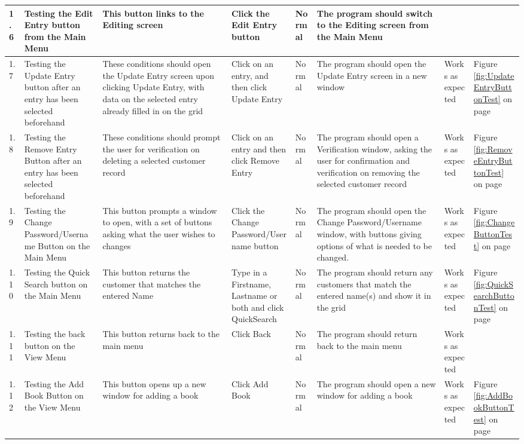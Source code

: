 \begin{landscape}
\begin{center}
\begin{longtable}{|p{1.5cm}|p{2cm}|p{2.5cm}|p{2.5cm}|p{2cm}|p{2cm}|p{2cm}|p{2cm}|}
\rowcolor{gray} 1.6 & Testing the Edit Entry button from the Main Menu & This button links to the Editing screen & Click the Edit Entry button & Normal & The program should switch to the Editing screen from the Main Menu &  & \\ \hline
        1.7 & Testing the Update Entry button after an entry has been selected beforehand & These conditions should open the Update Entry screen upon clicking Update Entry, with data on the selected entry already filled in on the grid & Click on an entry, and then click Update Entry & Normal & The program should open the Update Entry screen in a new window & Works as expected & Figure \ref{fig:UpdateEntryButtonTest} on page \pageref{fig:UpdateEntryButtonTest} \\ \hline
        1.8 & Testing the Remove Entry Button after an entry has been selected beforehand & These conditions should prompt the user for verification on deleting a selected customer record & Click on an entry and then click Remove Entry & Normal & The program should open a Verification window, asking the user for confirmation and verification on removing the selected customer record & Works as expected & Figure \ref{fig:RemoveEntryButtonTest} on page \pageref{fig:RemoveEntryButtonTest} \\ \hline
\rowcolor{lightgray} 1.9 & Testing the Change Password/Username Button on the Main Menu & This button prompts a window to open, with a set of buttons asking what the user wishes to changes & Click the Change Password/Username button & Normal & The program should open the Change Password/Username window, with buttons giving options of what is needed to be changed. & Works as expected & Figure \ref{fig:ChangeButtonTest} on page \pageref{fig:ChangeButtonTest} \\ \hline
\rowcolor{lightgray} 1.10 & Testing the Quick Search button on the Main Menu & This button returns the customer that matches the entered Name & Type in a Firstname, Lastname or both and click QuickSearch & Normal & The program should return any customers that match the entered name(s) and show it in the grid & Works as expected & Figure \ref{fig:QuickSearchButtonTest} on page \pageref{fig:QuickSearchButtonTest} \\ \hline
        1.11 & Testing the back button on the View Menu & This button returns back to the main menu & Click Back & Normal & The program should return back to the main menu & Works as expected & \\ \hline
        1.12 & Testing the Add Book Button on the View Menu & This button opens up a new window for adding a book & Click Add Book & Normal & The program should open a new window for adding a book & Works as expected & Figure \ref{fig:AddBookButtonTest} on page \pageref{fig:AddBookButtonTest} \\ \hline

\end{longtable}
\end{center}
\end{landscape}
